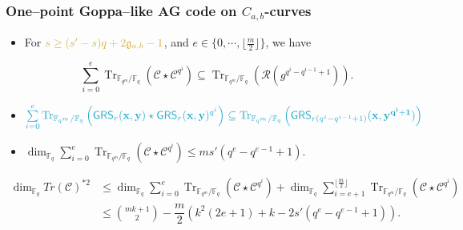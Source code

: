 \documentclass[
10pt, %
%
aspectratio=169, %
]{beamer}
\theoremstyle{plain}%
\theoremstyle{definition}
\theoremstyle{remark}
\newcommand{\calC}{\mathcal{C}}
\newcommand{\calR}{\mathcal{R}}
\newcommand{\fq}{\mathbb{F}_{q}}
\newcommand{\Tr}[1]{\operatorname{Tr}_{\mathbb{F}_{q^m}/\fq}\left(#1\right)}
\newcommand{\GRS}{\operatorname{\mathsf{GRS}}}
\begin{document}
\begin{frame}
	\frametitle{One--point Goppa--like AG code on $C_{a,b}$-curves}
	\begin{itemize}
		\item For $\mathcolor{gold}{s \geq (s'-s)q+2\mathfrak{g}_{a,b}-1}$, and $e\in \{0,\cdots,\lfloor \frac{m}{2}\rfloor\}$, we have
		\vspace{-0.6em}
		
	 $$ \sum \limits_{i=0}^{e}\Tr{\calC\star\calC^{q^i}} \subseteq \Tr{\calR(g^{q^{i}-q^{i-1}+1})}.$$
	 \item[\textrightarrow] $\mathcolor{ballblue}{\sum\limits_{i=0}^{e} \Tr{\GRS_r(\mathbf{x},\mathbf{y})\star \GRS_r(\mathbf{x},\mathbf{y})^{q^i}} \subseteq \Tr{\GRS_{r(q^i -q^{i-1}+1)}(\mathbf{x},\mathbf{y^{q^i+1}})}}$
		\item $\dim_{\fq}\sum \limits_{i=0}^{e}\Tr{\calC\star\calC^{q^i}} \leq ms'(q^e - q^{e-1} +1)$.
	\end{itemize}
\vspace{-0.7em}
\begin{align*}
	\dim_{\fq}Tr(\calC)^{*2} &\leq \dim_{\fq}\sum \limits_{i=0}^{e}\Tr{\calC\star\calC^{q^i}} + \dim_{\fq}\sum \limits_{i=e+1}^{\lfloor \frac{m}{2}\rfloor}\Tr{\calC\star\calC^{q^i}}\\
	&\leq \binom{mk+1}{2} - \dfrac{m}{2}(k^2(2e+1)+k-2s'(q^{e}-q^{e-1}+1)).
\end{align*}
\end{frame}
\end{document}
